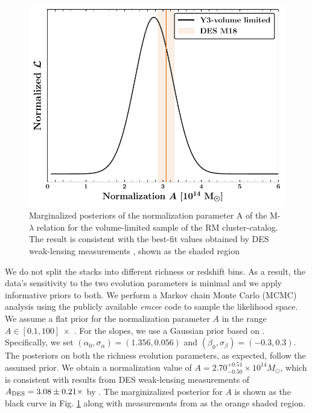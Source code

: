\begin{figure}[ht]
\includegraphics[width=\linewidth]{figs/M_rich_fitting_y3_v6_4_22_full_vl_JODY.pdf}
\caption{Marginalized posteriors of the normalization parameter A of the M-$\lambda$ relation for the volume-limited sample of the RM cluster-catalog. The result is consistent with the best-fit values obtained by DES weak-lensing measurements \citet{mcclintock18}, shown as the shaded region}
\label{fig_massrichness_fitting}
\end{figure}

We do not split the stacks into different richness or redshift bins.
As a result, the data's sensitivity to the two evolution parameters is minimal and we apply informative priors to both.
We perform a Markov chain Monte Carlo (MCMC) analysis %
using the publicly available \emph{emcee} \citep{mackey13} code to sample the likelihood space.
We assume a flat prior for the normalization parameter $A$ in the range $A \in [0.1,100]\ \times$ \munits. 
For the slopes, we use a Gaussian prior based on \citet{mcclintock18}. Specifically, we set $(\alpha_{0}, \sigma_{\alpha})= (1.356, 0.056)$ and $(\beta_{0}, \sigma_{\beta})= (-0.3, 0.3)$. 
The posteriors on both the richness evolution parameters, as expected, follow the assumed prior. %
We obtain a normalization value of $A = 2.70^{+0.51}_{-0.50} \times 10^{14} M_{\odot}$, which is consistent with results from DES weak-lensing measurements of $A_{\rm DES} = 3.08 \pm 0.21 \times$ \munits{} by \citet{mcclintock18}. 
The marginizalized posterior for $A$ is shown as the black curve in Fig. \ref{fig_massrichness_fitting} along with measurements from \citet{mcclintock18} as the orange shaded region.

